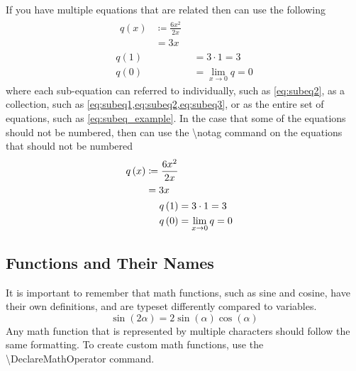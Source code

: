     If you have multiple equations that are related then can use the following
    \begin{subequations} \label{eq:subeq_example}
        \begin{align}
            \begin{split}
                q\left(x\right)&\coloneq\frac{6x^2}{2x} \\
                &=3x
            \end{split} \label{eq:subeq1} \\
            q\left(1\right)
                &=3\cdot 1=3 \label{eq:subeq2} \\
            q\left(0\right)
                &=\lim_{x\to 0} q=0 \label{eq:subeq3}
        \end{align}
    \end{subequations}
    where each sub-equation can referred to individually, such as \cref{eq:subeq2}, as a collection, such as \cref{eq:subeq1,eq:subeq2,eq:subeq3}, or as the entire set of equations, such as \cref{eq:subeq_example}.
    In the case that some of the equations should not be numbered, then can use the \textbackslash notag command on the equations that should not be numbered
    \begin{subequations}
        \begin{align}
            \begin{split}
                q\left(x\right)
                    &\coloneq\frac{6x^2}{2x} \\
                    &=3x
            \end{split} \\
            q\left(1\right)
                &=3\cdot 1=3 \notag \\
            q\left(0\right)
                &=\lim_{x\to 0} q=0
        \end{align}
    \end{subequations}

\subsection{Functions and Their Names}
    It is important to remember that math functions, such as sine and cosine, have their own definitions, and are typeset differently compared to variables.
    \begin{equation}
        \sin\left(2\alpha\right)=2\sin\left(\alpha\right)\cos\left(\alpha\right)
    \end{equation}
    Any math function that is represented by multiple characters should follow the same formatting.
    To create custom math functions, use the \textbackslash DeclareMathOperator command.

